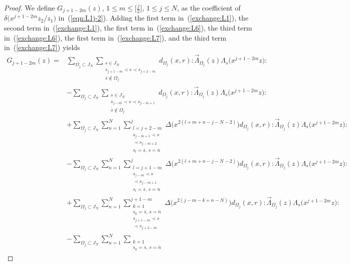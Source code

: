 \documentclass[10pt,a4paper]{amsart}
\numberwithin{equation}{section}
\begin{document}
\begin{proof}
We define ${G}_{j+1-2m}(z)$, $1\leq m \leq \big[\frac{j}{2}\big]$, $1\leq j \leq N$,
as the coefficient of $\delta\big(x^{j+1-2m}z_2/z_1\big)$ in~(\ref{eqn:L1j-2}).
Adding the first term in~(\ref{exchange:L1}),
the second term in~(\ref{exchange:L1}), the first term in~(\ref{exchange:L6}),
the third term in~(\ref{exchange:L6}), the first term in~(\ref{exchange:L7}),
and the third term in~(\ref{exchange:L7}) yields
\begin{align*}
{G}_{j+1-2m}(z)={}&\sum_{\Omega_j \subset J_N}
\sum\limits_{\substack{s \in J_N\\s_{j+1-m} \prec s \prec s_{j+2-m}
\\ \overline{s} \notin \Omega_j}}
d_{\Omega_j}(x,r){:}\overrightarrow{\Lambda}_{\Omega_j}(z)
\Lambda_s\big(x^{j+1-2m}z\big) {:}
\\
&-\sum_{\Omega_j \subset J_N}\sum\limits_{\substack{s\in J_N\\s_{j-m} \prec s \prec s_{j-m+1}
\\ \overline{s} \notin \Omega_j}}d_{\Omega_j}(x,r)
{:}\overrightarrow{\Lambda}_{\Omega_j}(z)
\Lambda_s\big(x^{j+1-2m}z\big){:}
\\
&+\sum_{\Omega_j \subset J_N}\sum_{n=1}^N\sum\limits_{\substack{l=j+2-m
\\s_{j-m+1} \prec s\\ \prec s_{j-m+2}\\ s_l=\overline{s},\, s=n}}^j
\Delta\big(x^{2(l+m+n-j-N-2)}\big) d_{\Omega_j}(x,r)
{:}\overrightarrow{\Lambda}_{\Omega_j}(z)\Lambda_s\big(x^{j+1-2m}z\big){:}
\\
&-\sum_{\Omega_j \subset J_N}\sum_{n=1}^N\sum\limits_{\substack{l=j+1-m
\\s_{j-m} \prec s\\ \prec s_{j-m+1}\\ s_l=\overline{s},\, s=n}}^j
\Delta\big(x^{2(l+m+n-j-N-2)}\big) d_{\Omega_j}(x,r)
{:}\overrightarrow{\Lambda}_{\Omega_j}(z)\Lambda_s\big(x^{j+1-2m}z\big){:}
\\
&+\sum_{\Omega_j \subset J_N}\sum_{n=1}^N
\sum\limits_{\substack{k=1
\\ s_k=\overline{s},\, s=\overline{n}\\ s_{j+1-m} \prec s\\ \prec s_{j+2-m}}}^{j+1-m}
\Delta\big(x^{2(j-m-k+n-N)}\big) d_{\Omega_j}(x,r)
{:}\overrightarrow{\Lambda}_{\Omega_j}(z)\Lambda_s\big(x^{j+1-2m}z\big){:}
\\
&-\sum_{\Omega_j \subset J_N}\sum_{n=1}^N
\sum\limits_{\substack{k=1\\ s_k=\overline{s},\, s=\overline{n}
}}
\end{align*}
\end{proof}
\end{document}
